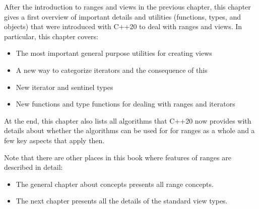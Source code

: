 After the introduction to ranges and views in the previous chapter, this chapter gives a first overview of important details and utilities (functions, types, and objects) that were introduced with C++20 to deal with ranges and views. In particular, this chapter covers:

\begin{itemize}
\item
The most important general purpose utilities for creating views

\item
A new way to categorize iterators and the consequence of this

\item
New iterator and sentinel types

\item
New functions and type functions for dealing with ranges and iterators
\end{itemize}

At the end, this chapter also lists all algorithms that C++20 now provides with details about whether the algorithms can be used for for ranges as a whole and a few key aspects that apply then.

Note that there are other places in this book where features of ranges are described in detail:

\begin{itemize}
\item
The general chapter about concepts presents all range concepts.

\item
The next chapter presents all the details of the standard view types.
\end{itemize}













